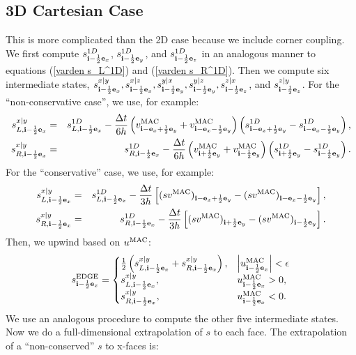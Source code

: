 \documentclass[11pt]{article}
\def\half  {\frac{1}{2}}
\def\dt    {\Delta t}
\def\edge  {\rm EDGE}
\def\mac   {\rm MAC}
\def\eb    {{\bf e}}
\def\ib    {{\bf i}}
\begin{document}
\subsection{3D Cartesian Case}
This is more complicated than the 2D case because we include corner coupling.  We first compute $s_{\ib-\half\eb_x}^{1D}$, $s_{\ib-\half\eb_y}^{1D}$, and $s_{\ib-\half\eb_z}^{1D}$ in an analogous manner to equations (\ref{varden s_L^1D}) and (\ref{varden s_R^1D}).  Then we compute six intermediate states, $s_{\ib-\half\eb_x}^{x|y}, s_{\ib-\half\eb_x}^{x|z}, s_{\ib-\half\eb_y}^{y|x}, s_{\ib-\half\eb_y}^{y|z}, s_{\ib-\half\eb_z}^{z|x}$, and $s_{\ib-\half\eb_z}^{z|y}$.  For the ``non-conservative case'', we use, for example:
\begin{eqnarray}
s_{L,\ib-\half\eb_x}^{x|y} &=& s_{L,\ib-\half\eb_x}^{1D} - \frac{\dt}{6h}\left(v_{\ib-\eb_x+\half\eb_y}^{\mac} + v_{\ib-\eb_x-\half\eb_y}^{\mac}\right)\left(s_{\ib-\eb_x+\half\eb_y}^{1D} - s_{\ib-\eb_x-\half\eb_y}^{1D}\right), \\
s_{R,\ib-\half\eb_x}^{x|y} &=& s_{R,\ib-\half\eb_x}^{1D} - \frac{\dt}{6h}\left(v_{\ib+\half\eb_y}^{\mac} + v_{\ib-\half\eb_y}^{\mac}\right)\left(s_{\ib+\half\eb_y}^{1D} - s_{\ib-\half\eb_y}^{1D}\right).
\end{eqnarray}
For the ``conservative'' case, we use, for example:
\begin{eqnarray}
s_{L,\ib-\half\eb_x}^{x|y} &=& s_{L,\ib-\half\eb_x}^{1D} - \frac{\dt}{3h}\left[(sv^{\mac})_{\ib-\eb_x+\half\eb_y}-(sv^{\mac})_{\ib-\eb_x-\half\eb_y}\right], \\
s_{R,\ib-\half\eb_x}^{x|y} &=& s_{R,\ib-\half\eb_x}^{1D} - \frac{\dt}{3h}\left[(sv^{\mac})_{\ib+\half\eb_y}-(sv^{\mac})_{\ib-\half\eb_y}\right].
\end{eqnarray}
Then, we upwind based on $u^{\mac}$:
\begin{equation}
s_{\ib-\half\eb_x}^{\edge} =
\begin{cases}
\half\left(s_{L,\ib-\half\eb_x}^{x|y} + s_{R,\ib-\half\eb_x}^{x|y}\right), & \left|u^{\mac}_{\ib-\half\eb_x}\right| < \epsilon \\
s_{L,\ib-\half\eb_x}^{x|y}, & u^{\mac}_{\ib-\half\eb_x} > 0, \\
s_{R,\ib-\half\eb_x}^{x|y}, & u^{\mac}_{\ib-\half\eb_x} < 0.
\end{cases}
\end{equation}
We use an analogous procedure to compute the other five intermediate states.  Now we do a full-dimensional extrapolation of $s$ to each face.  The extrapolation of a ``non-conserved'' $s$ to x-faces is:
\end{document}
